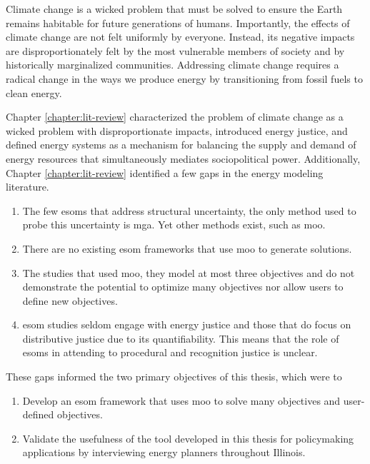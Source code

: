 Climate change is a wicked problem that must be solved to ensure the Earth
remains habitable for future generations of humans. Importantly, the effects of
climate change are not felt uniformly by everyone. Instead, its negative impacts
are disproportionately felt by the most vulnerable members of society and by
historically marginalized communities. Addressing climate change requires a
radical change in the ways we produce energy by transitioning from fossil fuels
to clean energy.

Chapter \ref{chapter:lit-review} characterized the problem of climate change as
a wicked problem with disproportionate impacts, introduced energy justice, and
defined energy systems as a mechanism for balancing the supply and demand of
energy resources that simultaneously mediates sociopolitical power.
Additionally, Chapter \ref{chapter:lit-review} identified a few gaps in the
energy modeling literature. 
\begin{enumerate}
    \item The few \acp{esom} that address structural uncertainty, the only
    method used to probe this uncertainty is \acf{mga}. Yet other methods exist,
    such as \acf{moo}.
    \item There are no existing \ac{esom} frameworks that use \ac{moo} to
    generate solutions.
    \item The studies that used \ac{moo}, they model at most three objectives
    and do not demonstrate the potential to optimize many objectives nor allow
    users to define new objectives.
    \item \ac{esom} studies seldom engage with energy justice and those that do
    focus on distributive justice due to its quantifiability. This means that
    the role of \acp{esom} in attending to procedural and recognition justice is
    unclear.
\end{enumerate}
These gaps informed the two primary objectives of this thesis, which were to
\begin{enumerate}
    \item Develop an \ac{esom} framework that uses \acl{moo} to solve many
    objectives and user-defined objectives.
    \item Validate the usefulness of the tool developed in this thesis for
    policymaking applications by interviewing energy planners throughout
    Illinois.
\end{enumerate}

